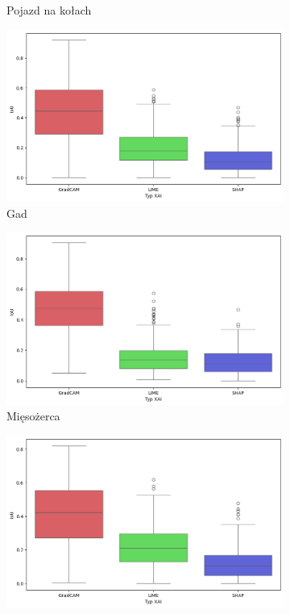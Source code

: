 \begin{figure}[h]
\begin{subfigure}[b]{0.3\textwidth}
		\caption{Pojazd na kołach}
	\end{subfigure}
	\begin{subfigure}[b]{0.3\textwidth}
		\centering\includegraphics[width=.9\textwidth]{img/base_iou_reptile}
		\caption{Gad}
	\end{subfigure}
	\begin{subfigure}[b]{0.3\textwidth}
		\centering\includegraphics[width=.9\textwidth]{img/base_iou_carnivore}
		\caption{Mięsożerca}
	\end{subfigure}
	\begin{subfigure}[b]{0.3\textwidth}
		\centering\includegraphics[width=.9\textwidth]{img/base_iou_insect}

\end{subfigure}
\end{figure}
